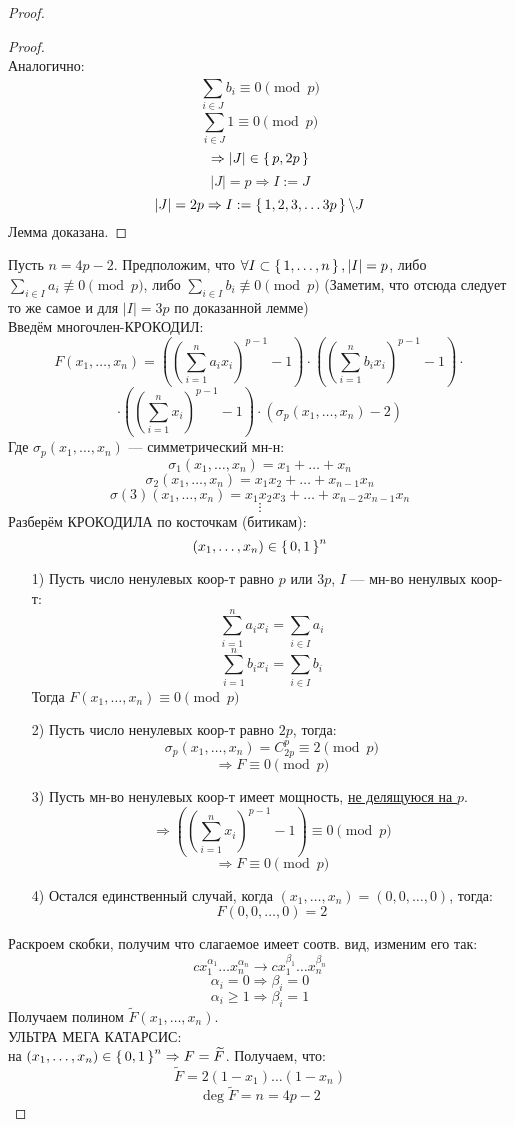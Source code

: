 \begin{proof}
\begin{proof}
\[ \]
 Аналогично:
 \[
 \sum_{i \in J}^{} b_i \equiv 0 \pmod p
 \]
 \[
 \sum_{i \in J}^{} 1 \equiv 0 \pmod p
 \]
 \[
 \Rightarrow \left|J\right| \in \set{p, 2p}
 \]
 \[
 \left|J\right| = p \Rightarrow I := J
 \]
 \[
 \left|J\right| = 2p \Rightarrow I := \set{1, 2, 3, \ldots 3p} \backslash J
 \]
 Лемма доказана.
\end{proof}
Пусть $n = 4p - 2$. Предположим, что $\forall I \subset \set{1, \ldots, n}, \left|I\right| = p$, либо $\sum_{i \in I}^{} a_i \not\equiv 0 \pmod p$, либо $\sum_{i \in I}^{} b_i \not\equiv 0 \pmod p$ (Заметим, что отсюда следует то же самое и для $\left|I\right| = 3p$ по доказанной лемме)\\
Введём многочлен-КРОКОДИЛ:
\[
F(x_1, \ldots, x_n) = \left(\left(\sum_{ i = 1}^{n} a_i x_i\right)^{p - 1} - 1\right) \cdot \left(\left(\sum_{i = 1}^{n} b_i x_i\right)^{p - 1} - 1\right) \cdot
\]
\[
 \cdot \left(\left(\sum_{i = 1}^{n} x_i\right)^{p - 1} - 1\right) \cdot \left(\sigma_p(x_1, \ldots, x_n) - 2\right)
\]
Где $\sigma_p(x_1, \ldots, x_n)$ --- симметрический мн-н:
\[
\sigma_1(x_1,\ldots, x_n) = x_1 + \ldots + x_n
\]
\[
\sigma_2(x_1, \ldots, x_n) = x_1x_2 + \ldots + x_{n - 1}x_n
\]
\[
  \sigma(3)(x_1, \ldots, x_n) = x_1x_2x_3 + \ldots + x_{n - 2}x_{n - 1}x_n
\]
\[
\vdots
\]
Разберём КРОКОДИЛА по косточкам (битикам):
\[
  (x_1, \ldots, x_n) \in \set{0, 1}^{n}
\]
\begin{itemize}
  \item [1) ] Пусть число ненулевых коор-т равно $p$ или $3p$, $I$ --- мн-во ненулвых коор-т:
    \[
    \sum_{i = 1}^{n} a_i x_i = \sum_{i \in I}^{} a_i
    \]
    \[
    \sum_{i = 1}^{n} b_i x_i = \sum_{i \in I}^{} b_i
    \]
    Тогда $F(x_1, \ldots, x_n) \equiv 0 \pmod p$
  \item [2) ] Пусть число ненулевых коор-т равно $2p$, тогда:
    \[
    \sigma_p(x_1, \ldots, x_n) = C_{2p}^{p} \equiv 2 \pmod p
    \]
    \[
    \Rightarrow F \equiv 0 \pmod p
    \]
  \item [3) ] Пусть мн-во ненулевых коор-т имеет мощность, \underline{не делящуюся на $p$}.
    \[
    \Rightarrow \left(\left(\sum_{i = 1}^{n} x_i\right)^{p - 1} - 1\right) \equiv 0 \pmod p
    \]
    \[
    \Rightarrow F \equiv 0 \pmod p
    \]
  \item [4) ] Остался единственный случай, когда $(x_1, \ldots, x_n) = (0, 0, \ldots, 0)$, тогда:
    \[
    F(0, 0,\ldots, 0) = 2
    \]
\end{itemize}
Раскроем скобки, получим что слагаемое имеет соотв. вид, изменим его так:
\[
  c x_1^{\alpha_1} \ldots x_n^{\alpha_n} \rightarrow cx_1^{\beta_1}\ldots x_n^{\beta_n}
\]
\[
  \alpha_i = 0 \Rightarrow \beta_i = 0
\]
\[
  \alpha_i \geq 1 \Rightarrow \beta_i = 1
\]
Получаем полином $\widetilde{F}(x_1, \ldots, x_n)$. \\
УЛЬТРА МЕГА КАТАРСИС: \\
на $(x_1, \ldots, x_n) \in \set{0, 1}^{n}\Rightarrow F = \widetilde{F}$. Получаем, что:
\[
\widetilde{F} = 2(1 - x_1)\ldots(1 - x_n)
\]
\[
\deg \widetilde{F} = n = 4p - 2
\]
\end{proof}

